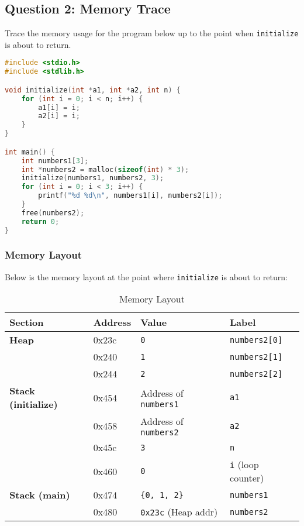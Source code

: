 \documentclass[12pt]{article}
\begin{document}
\pagebreak

\subsection*{Question 2: Memory Trace}
Trace the memory usage for the program below up to the point when \verb|initialize| is about to return.

\begin{lstlisting}[language=C]
#include <stdio.h>
#include <stdlib.h>

void initialize(int *a1, int *a2, int n) {
    for (int i = 0; i < n; i++) {
        a1[i] = i;
        a2[i] = i;
    }
}

int main() {
    int numbers1[3];
    int *numbers2 = malloc(sizeof(int) * 3);
    initialize(numbers1, numbers2, 3);
    for (int i = 0; i < 3; i++) {
        printf("%d %d\n", numbers1[i], numbers2[i]);
    }
    free(numbers2);
    return 0;
}
\end{lstlisting}

\subsubsection*{Memory Layout}
Below is the memory layout at the point where \verb|initialize| is about to return:

\begin{table}[h!]
    \centering
    \begin{tabular}{|l|l|l|l|}
        \hline
        \textbf{Section}         & \textbf{Address} & \textbf{Value}             & \textbf{Label}          \\ \hline
        \textbf{Heap}            & 0x23c            & \verb|0|                   & \verb|numbers2[0]|      \\ \hline
                                 & 0x240            & \verb|1|                   & \verb|numbers2[1]|      \\ \hline
                                 & 0x244            & \verb|2|                   & \verb|numbers2[2]|      \\ \hline
        \textbf{Stack (initialize)} & 0x454         & Address of \verb|numbers1| & \verb|a1|               \\ \hline
                                 & 0x458            & Address of \verb|numbers2| & \verb|a2|               \\ \hline
                                 & 0x45c            & \verb|3|                   & \verb|n|                \\ \hline
                                 & 0x460            & \verb|0|                   & \verb|i| (loop counter) \\ \hline
        \textbf{Stack (main)}    & 0x474            & \verb|{0, 1, 2}|           & \verb|numbers1|         \\ \hline
                                 & 0x480            & \verb|0x23c| (Heap addr)   & \verb|numbers2|         \\ \hline
    \end{tabular}
    \caption{Memory Layout}
    \label{tab:memory_layout}
\end{table}
\end{document}
